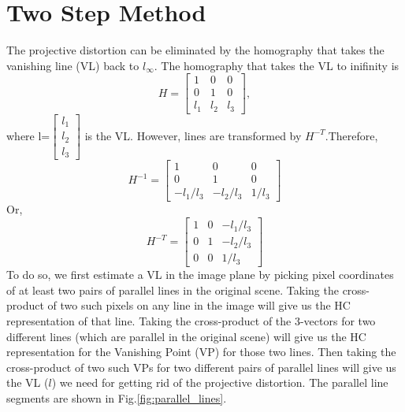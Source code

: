 \documentclass{article}
\begin{document}
\newpage
\section{Two Step Method}
The projective distortion can be eliminated by the homography that takes the vanishing line (VL) back to $l_\infty$. The homography that takes the VL to inifinity is 
\begin{equation}
	H = 
	\begin{bmatrix}
		1 & 0 & 0\\0 & 1 & 0\\l_1 & l_2 & l_3
	\end{bmatrix},
\end{equation}
where l=$\begin{bmatrix}
l_1 \\ l_2 \\l_3
\end{bmatrix}$ is the VL. However, lines are transformed by $H^{-T}$.Therefore,
\begin{equation}
	H^{-1} = \begin{bmatrix}
		1 & 0 & 0\\0 & 1 & 0\\-l_1/l_3 & -l_2/l_3 & 1/l_3
	\end{bmatrix}
\end{equation}
Or,
\begin{equation}
	H^{-T} = \begin{bmatrix}
		1 & 0 & -l_1/l_3\\0 & 1 & -l_2/l_3\\ 0 & 0 & 1/l_3
	\end{bmatrix}
\end{equation}
To do so, we first estimate a VL in the image plane by picking pixel coordinates of at least two pairs of parallel lines in the original scene. Taking the cross-product of two such pixels on any line in the image will give us the HC representation of that line. Taking the cross-product of the 3-vectors for two different lines (which are parallel in the original scene) will give us the HC representation for the Vanishing Point (VP) for those two lines. Then taking the cross-product of two such VPs for two different pairs of parallel lines will give us the VL ($l$) we need for getting rid of the projective distortion. The parallel line segments are shown in Fig.\ref{fig:parallel_lines}.
\end{document}

